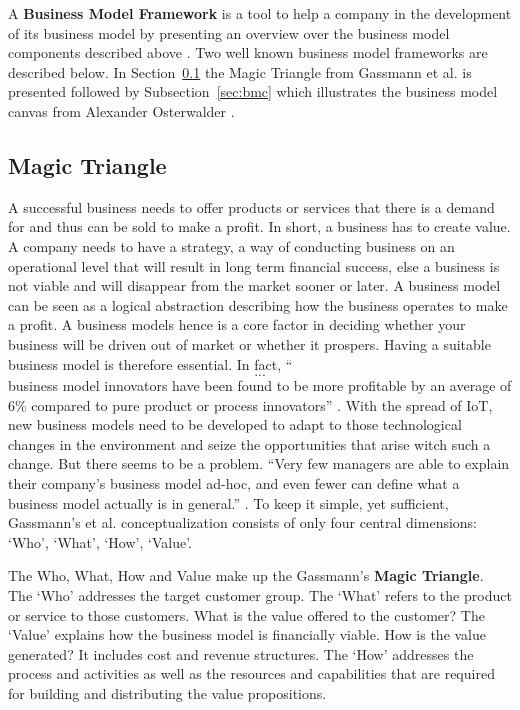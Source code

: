  		A \textbf{Business Model Framework} is a tool to help a company in the development of its business model by presenting an overview over the business model components described above \cite{dijkman}. Two well known business model frameworks are described below. In Section~\ref{sec:mt} the Magic Triangle from Gassmann et al. \cite{gassmann55} is presented followed by Subsection~\ref{sec:bmc} which illustrates the business model canvas from Alexander Osterwalder \cite{osterwalder}.

	\subsection{Magic Triangle}
	\label{sec:mt}
		A successful business needs to offer products or services that there is a demand for and thus can be sold to make a profit. In short, a business has to create value. A company needs to have a strategy, a way of conducting business on an operational level that will result in long term financial success, else a business is not viable and will disappear from the market sooner or later. A business model can be seen as a logical abstraction describing how the business operates to make a profit. A business models hence is a core factor in deciding whether your business will be driven out of market or whether it prospers. Having a suitable business model is therefore essential. In fact, ``\[...\] business model innovators have been found to be more profitable by an average of 6\% compared to pure product or process innovators'' \cite[p. 90]{gassmann55} . With the spread of IoT, new business models need to be developed to adapt to those technological changes in the environment and seize the opportunities that arise witch such a change. But there seems to be a problem. ``Very few managers are able to explain their company's business model ad-hoc, and even fewer can define what a business model actually is in general.'' \cite[p.90]{gassmann55}. To keep it simple, yet sufficient, Gassmann's et al. conceptualization consists of only four central dimensions: `Who', `What', `How', `Value'. 

		The Who, What, How and Value make up the Gassmann's \textbf{Magic Triangle}. The `Who' addresses the target customer group. The `What' refers to the product or service to those customers. What is the value offered to the customer? The `Value' explains how the business model is financially viable. How is the value generated? It includes cost and revenue structures. The `How' addresses the process and activities as well as the resources and capabilities that are required for building and distributing the value propositions.		
					
